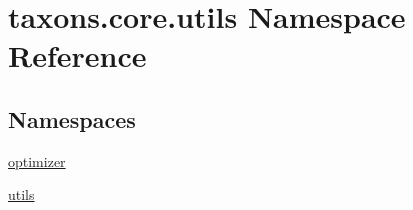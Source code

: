 \hypertarget{namespacetaxons_1_1core_1_1utils}{}\section{taxons.\+core.\+utils Namespace Reference}
\label{namespacetaxons_1_1core_1_1utils}
\subsection*{Namespaces}
\begin{DoxyCompactItemize}
\item 
 \hyperlink{namespacetaxons_1_1core_1_1utils_1_1optimizer}{optimizer}
\item 
 \hyperlink{namespacetaxons_1_1core_1_1utils_1_1utils}{utils}
\end{DoxyCompactItemize}
